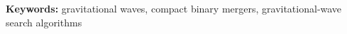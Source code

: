 


\clearpage
\thispagestyle{plain}
\textbf{Keywords:} gravitational waves, compact binary mergers, gravitational-wave search algorithms
\thispagestyle{plain}
